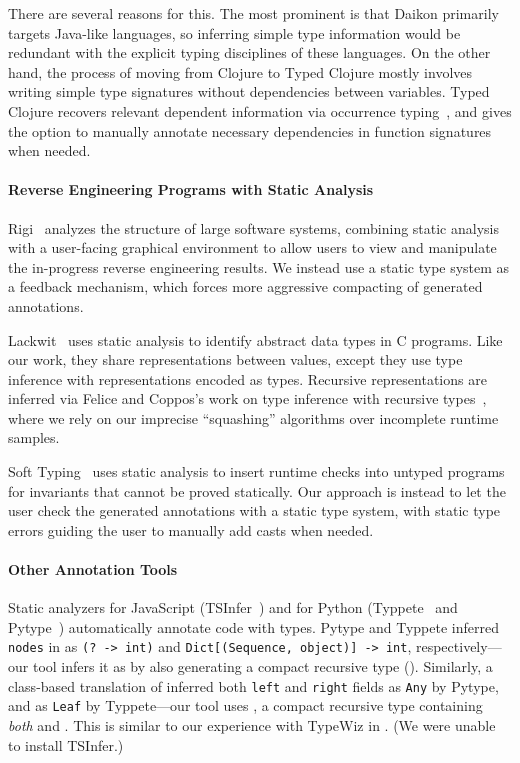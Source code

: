 There are several reasons for this. The most prominent is that Daikon
primarily targets Java-like languages, so inferring simple type information
would be redundant with the explicit typing disciplines of these languages.
On the other hand, the process of moving from Clojure to Typed Clojure
mostly involves writing simple type signatures without dependencies
between variables. Typed Clojure recovers relevant dependent information
via occurrence typing~, and gives the option to manually annotate necessary
dependencies in function signatures when needed.

\paragraph{Reverse Engineering Programs with Static Analysis}
Rigi~ analyzes
the structure of large software systems,
combining static analysis 
with a user-facing graphical environment to allow users to view and manipulate
the in-progress reverse engineering results.
We instead use a static type system as a feedback mechanism,
which forces more aggressive compacting of generated annotations.

Lackwit~ uses static analysis to identify abstract 
data types in C programs. Like our work, they share representations between
values, except they use type inference with representations encoded as types.
Recursive representations are inferred via Felice and Coppos's
work on type inference with recursive types~,
where we rely on our imprecise ``squashing'' algorithms over incomplete runtime samples.

Soft Typing~ uses static analysis to insert runtime checks into untyped
programs for invariants that cannot be proved statically. Our approach is instead to let
the user check the generated annotations with a static type system, with static type errors
guiding the user to manually add casts when needed.

\paragraph{Other Annotation Tools}
Static analyzers
for JavaScript
(TSInfer~) and for Python (Typpete~
and Pytype~)
automatically annotate code with types.
Pytype and Typpete inferred \texttt{nodes} in 
as \texttt{(? -> int)}
and \texttt{Dict[(Sequence, object)] -> int}, respectively---our tool 
infers it as \clj{[Op -> Int]} by also generating a compact recursive
type ().
Similarly, a class-based translation of 
inferred both \texttt{left} and \texttt{right}
fields
as \texttt{Any} by Pytype, and as \texttt{Leaf} by Typpete---our tool
uses ,
a compact recursive type containing \emph{both}  and .
This is similar to our experience with TypeWiz in .
(We were unable to install TSInfer.)

